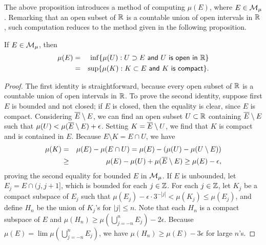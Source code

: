 The above proposition introduces a method of computing $\mu(E)$, where $E\in{\mathcal{M}}_\mu$.
Remarking that an open subset of ${\mathbb{R}}$ is a countable union of open intervals in ${\mathbb{R}}$, such computation reduces to the method given in the following proposition.
\begin{prop}
    If $E\in{\mathcal{M}}_\mu$, then
    \begin{eqnarray*}
        \mu(E)
        &=&\inf\{
            \mu(U)
            :
            \textsf{$U\supset E$ and $U$ is open in ${\mathbb{R}}$}
            \}\\
        &=&\sup\{
            \mu(K)
            :
            \textsf{$K\subset E$ and $K$ is compact}\}.
    \end{eqnarray*}
\end{prop}
\begin{proof}
    The first identity is straightforward, because every open subset of ${\mathbb{R}}$ is a countable union of open intervals in ${\mathbb{R}}$.
    To prove the second identity, suppose first $E$ is bounded and not closed; if $E$ is closed, then the equality is clear, since $E$ is compact.
    Considering $\overline{E}\setminus E$, we can find an open subset $U\subset{\mathbb{R}}$ containing $\overline{E}\setminus E$ such that $\mu(U)<\mu(\overline{E}\setminus E)+\epsilon$.
    Setting $K=\overline{E}\setminus U$, we find that $K$ is compact and is contained in $E$.
    Because $E\setminus K=E\cap U$, we have
    \begin{eqnarray*}
        \mu(K)&=&\mu(E)-\mu(E\cap U)=\mu(E)-(\mu(U)-\mu(U\setminus E))\\
        &\geq&\mu(E)-\mu(U)+\mu(\overline{E}\setminus E)\geq\mu(E)-\epsilon,
    \end{eqnarray*}
    proving the second equality for bounded $E$ in ${\mathcal{M}}_\mu$.
    If $E$ is unbounded, let $E_j=E\cap(j, j+1]$, which is bounded for each $j\in{\mathbb{Z}}$.
    For each $j\in{\mathbb{Z}}$, let $K_j$ be a compact subspace of $E_j$ such that $\mu(E_j)-\epsilon\cdot 3^{-|j|}<\mu(K_j)\leq\mu(E_j)$, and define $H_n$ be the union of $K_j$'s for $|j|\leq n$.
    Note that each $H_n$ is a compact subspace of $E$ and $\mu(H_n)\geq\mu\left(\bigcup_{j=-n}^n E_j\right)-2\epsilon$.
    Because $\mu(E)=\lim\mu\left(\bigcup_{j=-n}^n E_j\right)$, we have $\mu(H_n)\geq\mu(E)-3\epsilon$ for large $n$'s.
\end{proof}

